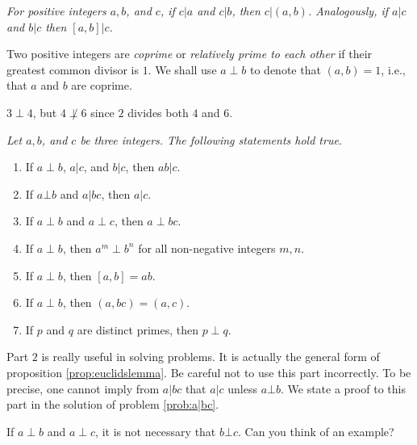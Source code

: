 \documentclass{subfile}
\begin{document}
	\begin{proposition}\slshape\label{prop:dividegcd}
		For positive integers $a, b$, and $c$, if $c|a$ and $c|b$, then $c|(a,b)$. Analogously, if $a|c$ and $b|c$ then $[a,b]|c$.
	\end{proposition}

	\begin{definition}
		Two positive integers are \textit{coprime} or \textit{relatively prime to each other} if their greatest common divisor is $1$. We shall use $a\perp b$ to denote that $(a,b)=1$, i.e., that $a$ and $b$ are coprime.
	\end{definition}

	\begin{example}
		$3\perp4$, but $4\not\perp6$ since $2$ divides both $4$ and $6$.
	\end{example}

	\begin{proposition}\slshape\label{prop:cpdiv}
		Let $a, b$, and $c$ be three integers. The following statements hold true.
		\begin{enumerate}
			\item If $a\perp b$, $a|c$, and $b|c$, then $ab|c$.
			\item If $a \bot b$ and $a|bc$, then $a|c$.
			\item If $a\perp b$ and $a\perp c$, then $a\perp bc$.
			\item If $a\perp b$, then $a^m\perp b^n$ for all non-negative integers $m,n$.
			\item If $a \perp b$, then $[a,b]=ab$.
			\item If $a \perp b$, then $(a,bc)=(a,c)$.
			\item If $p$ and $q$ are distinct primes, then $p \perp q$.
		\end{enumerate}
	\end{proposition}

	\begin{note}[1]
		Part $2$ is really useful in solving problems. It is actually the general form of proposition \eqref{prop:euclidslemma}. Be careful not to use this part incorrectly. To be precise, one cannot imply from $a|bc$ that $a|c$ unless $a \bot b$. We state a proof to this part in the solution of problem \eqref{prob:a|bc}.
	\end{note}

	\begin{note}[2]
		If $a\perp b$ and $a\perp c$, it is not necessary that $b \bot c$. Can you think of an example?
	\end{note}
\end{document}
